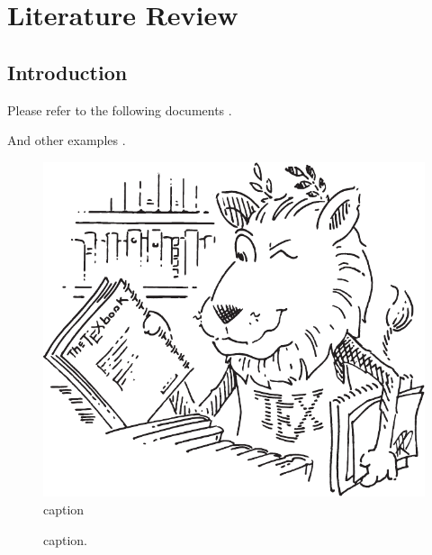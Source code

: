 \chapter{Literature Review}
\label{ch2:LiteratureReview}

\section{Introduction}
\label{ch2:sec:Introduction}

Please refer to the following  documents \cite{Gai_2005_LaTeXKeJiWenDangPaiBan,Gai_2006_LaTeXMathematicsCompanion,Ghaffari_2014_PreparingFiguresMatlab,Huang_2013_LeiTaiHePaiBanXiTongJianJieLaTeXNotes,Liu_2013_LaTeXRuMen,Oetiker_2019_YiFenBuTaiJianDuanDeLaTeX2eJieShao,Reckdahl_2017_LaTeX2eChaTuZhiNan}.

And other examples \cite{Beck_2018_FirstCourseComplex,Ben-Arieh_2003_TransformationsGeneralizedATSP,Eberly_2019_LeastSquaresFitting,Strang_2016_IntroductionLinearAlgebra}.

\begin{figure}[!htb]
  \centering
  \includegraphics[width=0.9\linewidth]{Figures/Chapter2/ctanlion.pdf}
  \caption{caption}\label{fig:fig1}
\end{figure}

\begin{figure}[!htb]
    \centering

    \caption{caption.}
    \label{fig:fig2}
\end{figure}

